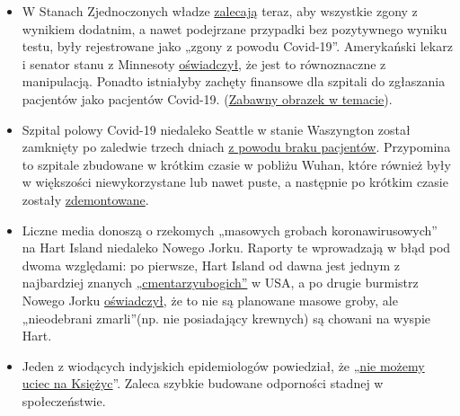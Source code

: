 \begin{itemize}
\tightlist
\item
  W Stanach Zjednoczonych władze
  \href{https://nypost.com/2020/04/07/feds-classify-all-coronavirus-patient-deaths-as-covid-19-deaths/?link=TD_mansionglobal_new_mansion_global.11147f181987fd93}{zalecają}
  teraz, aby wszystkie zgony z wynikiem dodatnim, a nawet podejrzane
  przypadki bez pozytywnego wyniku testu, były rejestrowane jako „zgony
  z powodu Covid-19''. Amerykański lekarz i senator stanu z Minnesoty
  \href{https://www.valleynewslive.com/content/misc/Sen-Dr-Jensens-Shocking-Admission-About-Coronavirus-569458361.html}{oświadczył},
  że jest to równoznaczne z manipulacją. Ponadto istniałyby zachęty
  finansowe dla szpitali do zgłaszania pacjentów jako pacjentów
  Covid-19.
  (\href{https://swprs.files.wordpress.com/2020/04/cv-2019-2020.jpg}{Zabawny
  obrazek w temacie}).
\item
  Szpital polowy Covid-19 niedaleko Seattle w stanie Waszyngton został
  zamknięty po zaledwie trzech dniach
  \href{https://www.yahoo.com/news/armys-seattle-field-hospital-closes-165646379.html}{z
  powodu braku pacjentów}. Przypomina to szpitale zbudowane w krótkim
  czasie w pobliżu Wuhan, które również były w większości
  niewykorzystane lub nawet puste, a następnie po krótkim czasie zostały
  \href{https://www.theguardian.com/world/2020/feb/12/what-chinas-empty-new-coronavirus-hospitals-say-about-its-secretive-system}{zdemontowane}.
\item
  Liczne media donoszą o rzekomych „masowych grobach koronawirusowych''
  na Hart Island niedaleko Nowego Jorku. Raporty te wprowadzają w błąd
  pod dwoma względami: po pierwsze, Hart Island od dawna jest jednym z
  najbardziej znanych
  \href{https://en.wikipedia.org/wiki/Hart_Island_(Bronx)\#Cemetery}{„cmentarzy}\href{https://en.wikipedia.org/wiki/Hart_Island_(Bronx)\#Cemetery}{ubogich''}
  w USA, a po drugie burmistrz Nowego Jorku
  \href{https://www.independent.co.uk/news/world/americas/new-york-coronavirus-cases-burials-bodies-covid-19-hart-island-a9459956.html}{oświadczył},
  że to nie są planowane masowe groby, ale „nieodebrani zmarli''(np. nie
  posiadający krewnych) są chowani na wyspie Hart.
\item
  Jeden z wiodących indyjskich epidemiologów powiedział, że
  „\href{https://www.business-standard.com/article/current-affairs/we-cannot-run-away-to-the-moon-need-to-develop-herd-immunity-dr-muliyil-120040601232_1.html}{nie
  możemy uciec na Księżyc}''. Zaleca szybkie budowane odporności stadnej
  w społeczeństwie.
\end{itemize}

